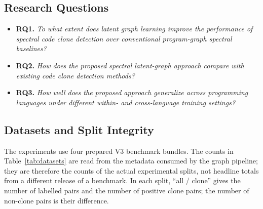 \documentclass[authoryear,final,5p,times,twocolumn]{elsarticle}
\theoremstyle{plain}
\begin{document}
\subsection{Research Questions}
\label{sec:research_questions}

\begin{itemize}
    \item \textbf{RQ1.} \textit{To what extent does latent graph learning
    improve the performance of spectral code clone detection over conventional
    program-graph spectral baselines?}

    \vspace{1em}

    \item \textbf{RQ2.} \textit{How does the proposed spectral latent-graph
    approach compare with existing code clone detection methods?}

    \vspace{1em}

    \item \textbf{RQ3.} \textit{How well does the proposed approach generalize
    across programming languages under different within- and cross-language
    training settings?}
\end{itemize}


\subsection{Datasets and Split Integrity}
\label{subsec:datasets}

The experiments use four prepared V3 benchmark bundles. The counts in
Table~\ref{tab:datasets} are read from the metadata consumed by the graph
pipeline; they are therefore the counts of the actual experimental splits,
not headline totals from a different release of a benchmark. In each split,
``all / clone'' gives the number of labelled pairs and the number of positive
clone pairs; the number of non-clone pairs is their difference.
\end{document}
